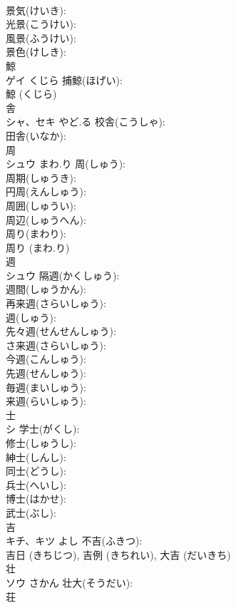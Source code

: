 \documentclass[8pt]{extreport}
\begin{document}
\begin{CJK}{UTF8}{min}
\\	景気(けいき): 
\\	光景(こうけい): 
\\	風景(ふうけい): 
\\	景色(けしき): 
\\	鯨			
\\	ゲイ	くじら	捕鯨(ほげい): 
\\	鯨 (くじら)
\\	舎			
\\	シャ、セキ	やど.る	校舎(こうしゃ): 
\\	田舎(いなか): 
\\	周			
\\	シュウ	まわ.り	周(しゅう): 
\\	周期(しゅうき): 
\\	円周(えんしゅう): 
\\	周囲(しゅうい): 
\\	周辺(しゅうへん): 
\\	周り(まわり): 
\\	周り (まわ.り)
\\	週			
\\	シュウ		隔週(かくしゅう): 
\\	週間(しゅうかん): 
\\	再来週(さらいしゅう): 
\\	週(しゅう): 
\\	先々週(せんせんしゅう): 
\\	さ来週(さらいしゅう): 
\\	今週(こんしゅう): 
\\	先週(せんしゅう): 
\\	毎週(まいしゅう): 
\\	来週(らいしゅう): 
\\	士			
\\	シ		学士(がくし): 
\\	修士(しゅうし): 
\\	紳士(しんし): 
\\	同士(どうし): 
\\	兵士(へいし): 
\\	博士(はかせ): 
\\	武士(ぶし): 
\\	吉			
\\	キチ、キツ	よし	不吉(ふきつ): 
\\	吉日 (きちじつ), 吉例 (きちれい), 大吉 (だいきち)
\\	壮			
\\	ソウ	さかん	壮大(そうだい): 
\\	荘			

\end{CJK}
\end{document}
